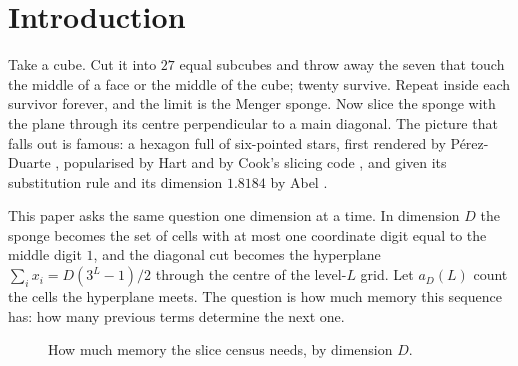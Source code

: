 \documentclass[11pt]{amsart}
\theoremstyle{definition}
\theoremstyle{remark}
\begin{document}

\newpage

\paperabstract

\section{Introduction}

Take a cube. Cut it into $27$ equal subcubes and throw away the seven that touch the middle of a face or the middle of the cube; twenty survive. Repeat inside each survivor forever, and the limit is the Menger sponge. Now slice the sponge with the plane through its centre perpendicular to a main diagonal. The picture that falls out is famous: a hexagon full of six-pointed stars, first rendered by P\'erez-Duarte \cite{perezduarte}, popularised by Hart \cite{hart} and by Cook's slicing code \cite{cook}, and given its substitution rule and its dimension $1.8184$ by Abel \cite{abelstars}.

This paper asks the same question one dimension at a time. In dimension $D$ the sponge becomes the set of cells with at most one coordinate digit equal to the middle digit $1$, and the diagonal cut becomes the hyperplane $\sum_i x_i = D(3^L-1)/2$ through the centre of the level-$L$ grid. Let $a_D(L)$ count the cells the hyperplane meets. The question is how much memory this sequence has: how many previous terms determine the next one.

\begin{figure}[ht]
\centering
{}
\caption{How much memory the slice census needs, by dimension $D$.}
\label{fig:order}
\end{figure}
\end{document}
